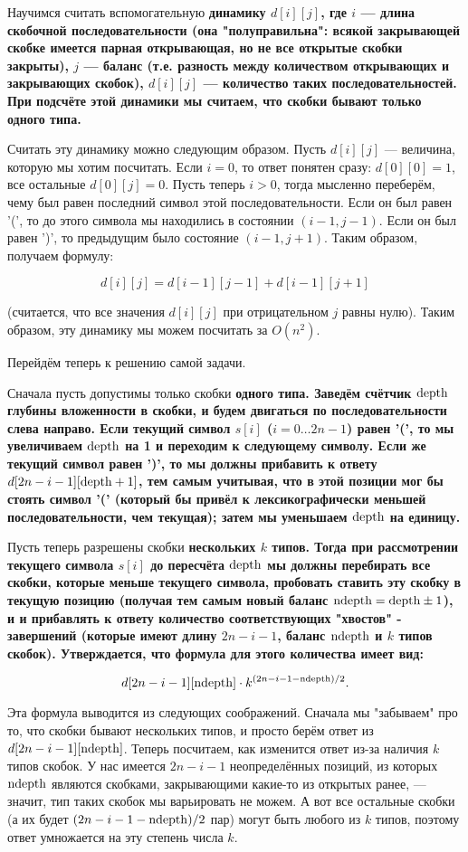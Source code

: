 Научимся считать вспомогательную \bf{динамику} $d[i][j]$, где $i$ --- длина скобочной последовательности (она "полуправильна": всякой закрывающей скобке имеется парная открывающая, но не все открытые скобки закрыты), $j$ --- баланс (т.е. разность между количеством открывающих и закрывающих скобок), $d[i][j]$ --- количество таких последовательностей. При подсчёте этой динамики мы считаем, что скобки бывают только одного типа.

Считать эту динамику можно следующим образом. Пусть $d[i][j]$ --- величина, которую мы хотим посчитать. Если $i=0$, то ответ понятен сразу: $d[0][0] = 1$, все остальные $d[0][j] = 0$. Пусть теперь $i > 0$, тогда мысленно переберём, чему был равен последний символ этой последовательности. Если он был равен '(', то до этого символа мы находились в состоянии $(i-1,j-1)$. Если он был равен ')', то предыдущим было состояние $(i-1,j+1)$. Таким образом, получаем формулу:

$$ d[i][j] = d[i-1][j-1] + d[i-1][j+1] $$

(считается, что все значения $d[i][j]$ при отрицательном $j$ равны нулю). Таким образом, эту динамику мы можем посчитать за $O(n^2)$.

Перейдём теперь к решению самой задачи.

Сначала пусть допустимы только скобки \bf{одного} типа. Заведём счётчик $\rm depth$ глубины вложенности в скобки, и будем двигаться по последовательности слева направо. Если текущий символ $s[i]$ ($i=0 \ldots 2n-1$) равен '(', то мы увеличиваем $\rm depth$ на 1 и переходим к следующему символу. Если же текущий символ равен ')', то мы должны прибавить к ответу $d[2n-i-1][\rm depth+1]$, тем самым учитывая, что в этой позиции мог бы стоять символ '(' (который бы привёл к лексикографически меньшей последовательности, чем текущая); затем мы уменьшаем $\rm depth$ на единицу.

Пусть теперь разрешены скобки \bf{нескольких} $k$ типов. Тогда при рассмотрении текущего символа $s[i]$ до пересчёта $\rm depth$ мы должны перебирать все скобки, которые меньше текущего символа, пробовать ставить эту скобку в текущую позицию (получая тем самым новый баланс $\rm ndepth = \rm depth \pm 1$), и и прибавлять к ответу количество соответствующих "хвостов" - завершений (которые имеют длину $2n-i-1$, баланс $\rm ndepth$ и $k$ типов скобок). Утверждается, что формула для этого количества имеет вид:

$$ d[2n-i-1][{\rm ndepth}] \cdot k^{ (2n-i-1 - {\rm ndepth})/2 }. $$

Эта формула выводится из следующих соображений. Сначала мы "забываем" про то, что скобки бывают нескольких типов, и просто берём ответ из $d[2n-i-1][{\rm ndepth}]$. Теперь посчитаем, как изменится ответ из-за наличия $k$ типов скобок. У нас имеется $2n-i-1$ неопределённых позиций, из которых $\rm ndepth$ являются скобками, закрывающими какие-то из открытых ранее, --- значит, тип таких скобок мы варьировать не можем. А вот все остальные скобки (а их будет $(2n-i-1 - {\rm ndepth})/2$ пар) могут быть любого из $k$ типов, поэтому ответ умножается на эту степень числа $k$.


